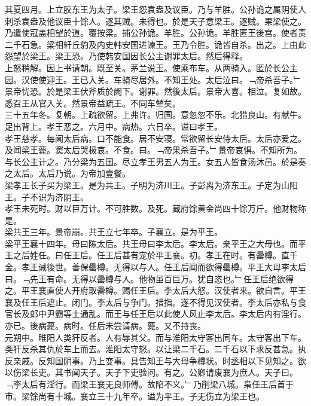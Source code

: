 \documentclass{zhvt-classic}
\begin{document}
\hspace*{2em}其夏四月。上立胶东王为太子。梁王怨袁盎及议臣。乃与羊胜。公孙诡之属阴使人刺杀袁盎及他议臣十馀人。逐其贼。未得也。於是天子意梁王。逐贼。果梁使之。乃遣使冠盖相望於道。覆按梁。捕公孙诡。羊胜。公孙诡。羊胜匿王後宫。使者责二千石急。梁相轩丘豹及内史韩安国进谏王。王乃令胜。诡皆自杀。出之。上由此怨望於梁王。梁王恐。乃使韩安国因长公主谢罪太后。然后得释。\\
\hspace*{2em}上怒稍解。因上书请朝。既至关。茅兰说王。使乘布车。从两骑入。匿於长公主园。汉使使迎王。王已入关。车骑尽居外。不知王处。太后泣曰。﹁帝杀吾子。﹂景帝忧恐。於是梁王伏斧质於阙下。谢罪。然後太后。景帝大喜。相泣。复如故。悉召王从官入关。然景帝益疏王。不同车辇矣。\\
\hspace*{2em}三十五年冬。复朝。上疏欲留。上弗许。归国。意忽忽不乐。北猎良山。有献牛。足出背上。孝王恶之。六月中。病热。六日卒。谥曰孝王。\\
\hspace*{2em}孝王慈孝。每闻太后病。口不能食。居不安寝。常欲留长安侍太后。太后亦爱之。及闻梁王薨。窦太后哭极哀。不食。曰。﹁帝果杀吾子。﹂景帝哀惧。不知所为。与长公主计之。乃分梁为五国。尽立孝王男五人为王。女五人皆食汤沐邑。於是奏之太后。太后乃说。为帝加壹餐。\\
\hspace*{2em}梁孝王长子买为梁王。是为共王。子明为济川王。子彭离为济东王。子定为山阳王。子不识为济阴王。\\
\hspace*{2em}孝王未死时。财以巨万计。不可胜数。及死。藏府馀黄金尚四十馀万斤。他财物称是。\\
\hspace*{2em}梁共王三年。景帝崩。共王立七年卒。子襄立。是为平王。\\
\hspace*{2em}梁平王襄十四年。母曰陈太后。共王母曰李太后。李太后。亲平王之大母也。而平王之后姓任。曰任王后。任王后甚有宠於平王襄。初。孝王在时。有罍樽。直千金。孝王诫後世。善保罍樽。无得以与人。任王后闻而欲得罍樽。平王大母李太后曰。﹁先王有命。无得以罍樽与人。他物虽百巨万。犹自恣也。﹂任王后绝欲得之。平王襄直使人开府取罍樽。赐任王后。李太后大怒。汉使者来。欲自言。平王襄及任王后遮止。闭门。李太后与争门。措指。遂不得见汉使者。李太后亦私与食官长及郎中尹霸等士通乱。而王与任王后以此使人风止李太后。李太后内有淫行。亦已。後病薨。病时。任后未尝请病。薨。又不持丧。\\
\hspace*{2em}元朔中。睢阳人类犴反者。人有辱其父。而与淮阳太守客出同车。太守客出下车。类犴反杀其仇於车上而去。淮阳太守怒。以让梁二千石。二千石以下求反甚急。执反亲戚。反知国阴事。乃上变事。具告知王与大母争樽状。时丞相以下见知之。欲以伤梁长吏。其书闻天子。天子下吏验问。有之。公卿请废襄为庶人。天子曰。﹁李太后有淫行。而梁王襄无良师傅。故陷不义。﹂乃削梁八城。枭任王后首于市。梁馀尚有十城。襄立三十九年卒。谥为平王。子无伤立为梁王也。\\
\end{document}
